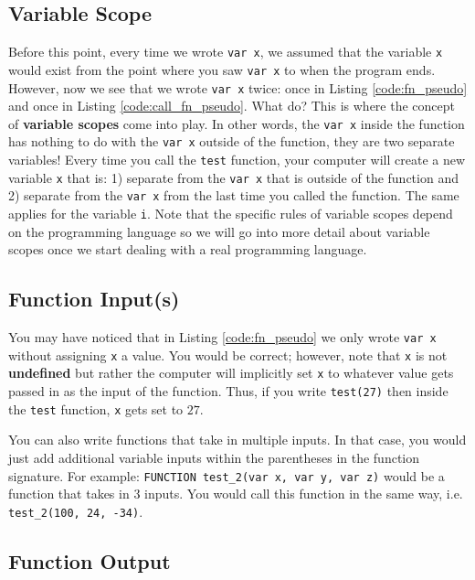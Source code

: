 \documentclass{article}
\begin{document}
\subsection{Variable Scope}

Before this point, every time we wrote \lstinline{var x}, we assumed that the variable \lstinline{x} would exist from the point where you saw \lstinline{var x} to when the program ends.
However, now we see that we wrote \lstinline{var x} twice: once in Listing \ref{code:fn_pseudo} and once in Listing \ref{code:call_fn_pseudo}.
What do?
This is where the concept of \textbf{variable scopes} come into play.
In other words, the \lstinline{var x} inside the function has nothing to do with the \lstinline{var x} outside of the function, they are two separate variables!
Every time you call the \lstinline{test} function, your computer will create a new variable \lstinline{x} that is: 1) separate from the \lstinline{var x} that is outside of the function and 2) separate from the \lstinline{var x} from the last time you called the function.
The same applies for the variable \lstinline{i}.
Note that the specific rules of variable scopes depend on the programming language so we will go into more detail about variable scopes once we start dealing with a real programming language.

\subsection{Function Input(s)}

You may have noticed that in Listing \ref{code:fn_pseudo} we only wrote \lstinline{var x} without assigning \lstinline{x} a value.
You would be correct; however, note that \lstinline{x} is not \textbf{undefined} but rather the computer will implicitly set \lstinline{x} to whatever value gets passed in as the input of the function.
Thus, if you write \lstinline{test(27)} then inside the \lstinline{test} function, \lstinline{x} gets set to $27$.

You can also write functions that take in multiple inputs.
In that case, you would just add additional variable inputs within the parentheses in the function signature.
For example: \lstinline{FUNCTION test_2(var x, var y, var z)} would be a function that takes in $3$ inputs.
You would call this function in the same way, i.e. \lstinline{test_2(100, 24, -34)}.

\subsection{Function Output}
\end{document}
